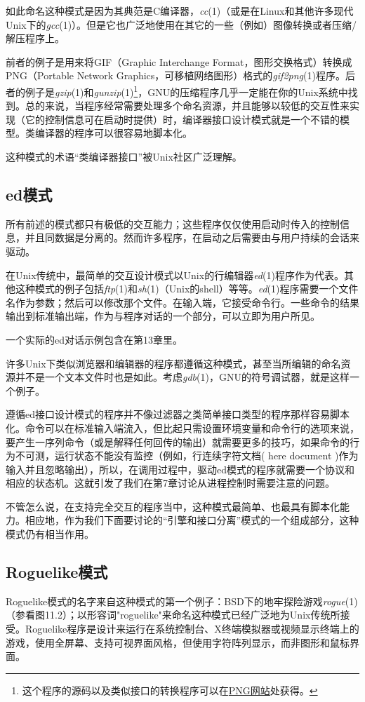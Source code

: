 \documentclass[12pt,oneside]{book}
\begin{document}
\begin{common-format}
如此命名这种模式是因为其典范是C编译器，\textit{cc}(1)（或是在Linux和其他许多现代Unix下的\textit{gcc}(1)）。但是它也广泛地使用在其它的一些（例如）图像转换或者压缩/解压程序上。

前者的例子是用来将GIF（Graphic Interchange Format，图形交换格式）转换成PNG（Portable Network Graphics，可移植网络图形）格式的\textit{gif2png}(1)程序。后者的例子是\textit{gzip}(1)和\textit{gunzip}(1)\footnote{这个程序的源码以及类似接口的转换程序可以在\href{http://www.cdrom.com/pub/png/}{PNG网站}处获得。}，GNU的压缩程序几乎一定能在你的Unix系统中找到。总的来说，当程序经常需要处理多个命名资源，并且能够以较低的交互性来实现（它的控制信息可在启动时提供）时，编译器接口设计模式就是一个不错的模型。类编译器的程序可以很容易地脚本化。

这种模式的术语“类编译器接口”被Unix社区广泛理解。

\subsection{ed模式}
所有前述的模式都只有极低的交互能力；这些程序仅仅使用启动时传入的控制信息，并且同数据是分离的。然而许多程序，在启动之后需要由与用户持续的会话来驱动。

在Unix传统中，最简单的交互设计模式以Unix的行编辑器\textit{ed}(1)程序作为代表。其他这种模式的例子包括\textit{ftp}(1)和\textit{sh}(1)（Unix的shell）等等。\textit{ed}(1)程序需要一个文件名作为参数；然后可以修改那个文件。在输入端，它接受命令行。一些命令的结果输出到标准输出端，作为与程序对话的一个部分，可以立即为用户所见。

一个实际的ed对话示例包含在第13章里。

许多Unix下类似浏览器和编辑器的程序都遵循这种模式，甚至当所编辑的命名资源并不是一个文本文件时也是如此。考虑\textit{gdb}(1)，GNU的符号调试器，就是这样一个例子。

遵循ed接口设计模式的程序并不像过滤器之类简单接口类型的程序那样容易脚本化。命令可以在标准输入端流入，但比起只需设置环境变量和命令行的选项来说，要产生一序列命令（或是解释任何回传的输出）就需要更多的技巧，如果命令的行为不可测，运行状态不能没有监控（例如，行连续字符文档( here document )作为输入并且忽略输出），所以，在调用过程中，驱动ed模式的程序就需要一个协议和相应的状态机。这就引发了我们在第7章讨论从进程控制时需要注意的问题。

不管怎么说，在支持完全交互的程序当中，这种模式最简单、也最具有脚本化能力。相应地，作为我们下面要讨论的“引擎和接口分离”模式的一个组成部分，这种模式仍有相当作用。


\subsection{Roguelike模式}
Roguelike模式的名字来自这种模式的第一个例子：BSD下的地牢探险游戏\textit{rogue}(1)（参看图11.2）；以形容词"roguelike"来命名这种模式已经广泛地为Unix传统所接受。Roguelike程序是设计来运行在系统控制台、X终端模拟器或视频显示终端上的游戏，使用全屏幕、支持可视界面风格，但使用字符阵列显示，而非图形和鼠标界面。


\end{common-format}
\end{document}
